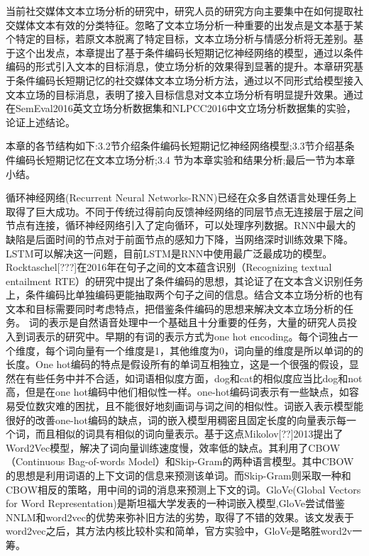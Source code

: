 

当前社交媒体文本立场分析的研究中，研究人员的研究方向主要集中在如何提取社交媒体文本有效的分类特征。忽略了文本立场分析一种重要的出发点是文本基于某个特定的目标，若原文本脱离了特定目标，文本立场分析与情感分析将无差别。基于这个出发点，本章提出了基于条件编码长短期记忆神经网络的模型，通过以条件编码的形式引入文本的目标消息，使立场分析的效果得到显著的提升。本章研究基于条件编码长短期记忆的社交媒体文本立场分析方法，通过以不同形式给模型接入文本立场的目标消息，表明了接入目标信息对文本立场分析有明显提升效果。通过在SemEval2016英文立场分析数据集和NLPCC2016中文立场分析数据集的实验，论证上述结论。

本章的各节结构如下:3.2节介绍条件编码长短期记忆神经网络模型;3.3节介绍基条件编码长短期记忆在文本立场分析;3.4 节为本章实验和结果分析;最后一节为本章小结。

循环神经网络(Recurrent Neural Networks-RNN)已经在众多自然语言处理任务上取得了巨大成功。不同于传统过得前向反馈神经网络的同层节点无连接层于层之间节点有连接，循环神经网络引入了定向循环，可以处理序列数据。RNN中最大的缺陷是后面时间的节点对于前面节点的感知力下降，当网络深时训练效果下降。LSTM可以解决这一问题，目前LSTM是RNN中使用最广泛最成功的模型。Rocktaschel[???]在2016年在句子之间的文本蕴含识别（Recognizing textual entailment RTE）的研究中提出了条件编码的思想，其论证了在文本含义识别任务上，条件编码比单独编码更能抽取两个句子之间的信息。结合文本立场分析的也有文本和目标需要同时考虑特点，把借鉴条件编码的思想来解决文本立场分析的任务。
词的表示是自然语音处理中一个基础且十分重要的任务，大量的研究人员投入到词表示的研究中。早期的有词的表示方式为one hot encoding。每个词独占一个维度，每个词向量有一个维度是1，其他维度为0，词向量的维度是所以单词的的长度。One hot编码的特点是假设所有的单词互相独立，这是一个很强的假设，显然在有些任务中并不合适，如词语相似度方面，dog和cat的相似度应当比dog和not高，但是在one hot编码中他们相似性一样。one-hot编码词表示有一些缺点，如容易受位数灾难的困扰，且不能很好地刻画词与词之间的相似性。词嵌入表示模型能很好的改善one-hot编码的缺点，词的嵌入模型用稠密且固定长度的向量表示每一个词，而且相似的词具有相似的词向量表示。基于这点Mikolov[??]2013提出了Word2Vec模型，解决了词向量训练速度慢，效率低的缺点。其利用了CBOW（Continuous Bag-of-words Model）和Skip-Gram的两种语言模型。其中CBOW的思想是利用词语的上下文词的信息来预测该单词。而Skip-Gram则采取一种和CBOW相反的策略，用中间的词的消息来预测上下文的词。GloVe(Global Vectors for Word Representation)是斯坦福大学发表的一种词嵌入模型,GloVe尝试借鉴NNLM和word2vec的优势来弥补旧方法的劣势，取得了不错的效果。该文发表于word2vec之后，其方法内核比较朴实和简单，官方实验中，GloVe是略胜word2v一筹。


